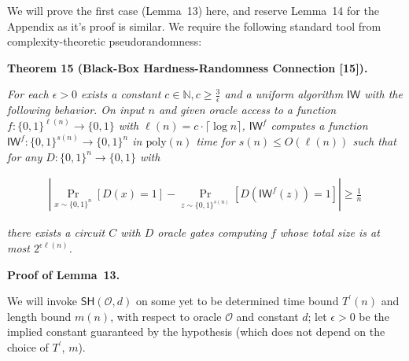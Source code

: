 


We will prove the first case (Lemma 13) here, and reserve Lemma 14 for the Appendix as it’s proof is similar. We require the following standard tool from complexity-theoretic pseudorandomness:\par





\par\medskip\noindent\textbf{
\textbf{Theorem 15}\textbf{ }(Black-Box Hardness-Randomness Connection [15])\textbf{.}
}\par



\emph{For each $\epsilon>0$ exists a constant $c\in\mathbb{N},c\geq\frac{3}{\epsilon}$ and a uniform algorithm $\mathsf{IW}$ with the following behavior. On input $n$ and given oracle access to a function $f:\{0,1\}^{\ell(n)}\to\{0,1\}$ with $\ell(n)=c\cdot\lceil\log n\rceil$, $\mathsf{IW}^{f}$ computes a function $\mathsf{IW}^{f}:\{0,1\}^{s(n)}\to\{0,1\}^{n}$ in $\mathrm{poly}(n)$ time for $s(n)\leq O(\ell(n))$ such that for any $D:\{0,1\}^{n}\to\{0,1\}$ with}\par


\[\begin{gathered}
|\Pr_{x\sim\{0,1\}^{n}}[D(x)=1]-\Pr_{z\sim\{0,1\}^{s(n)}}[D(\mathsf{IW}^{f}(z))=1]|\geq\frac{1}{n}
\end{gathered}\]


\emph{there exists a circuit $C$ with $D$ oracle gates computing $f$ whose total size is at most $2^{\epsilon\ell(n)}$.}\par






\par\medskip\noindent\textbf{Proof of Lemma 13.}\par




We will invoke $\mathsf{SH}(\mathcal{O},d)$ on some yet to be determined time bound $T^{\prime}(n)$ and length bound $m(n)$, with respect to oracle $\mathcal{O}$ and constant $d$; let $\epsilon>0$ be the implied constant guaranteed by the hypothesis (which does not depend on the choice of $T^{\prime}$, $m$).\par





